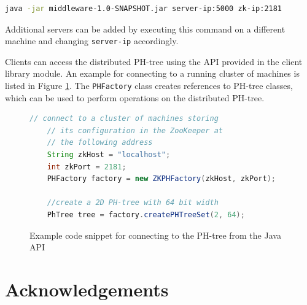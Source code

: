 \documentclass[11pt,a4paper]{globis-book}
\begin{document}
\begin{lstlisting}[language=BASH]
    java -jar middleware-1.0-SNAPSHOT.jar server-ip:5000 zk-ip:2181
\end{lstlisting}

Additional servers can be added by executing this command on a different machine and changing \texttt{server-ip} accordingly. 

Clients can access the distributed PH-tree using the API provided in the client library module. An example for connecting to a running cluster of machines is listed in Figure \ref{fig:java-code}. The \texttt{PHFactory} class creates references to PH-tree classes, which can be used to perform operations on the distributed PH-tree.

\begin{figure}
\begin{lstlisting}[language=Java]       
    // connect to a cluster of machines storing 
    // its configuration in the ZooKeeper at 
    // the following address 
    String zkHost = "localhost";
    int zkPort = 2181;
    PHFactory factory = new ZKPHFactory(zkHost, zkPort);

    //create a 2D PH-tree with 64 bit width
    PhTree tree = factory.createPHTreeSet(2, 64);    
\end{lstlisting}
\caption{Example code snippet for connecting to the PH-tree from the Java API}
\label{fig:java-code}
\end{figure}
\listoffigures

\chapter*{Acknowledgements}

\newpage
\thispagestyle{empty}





\end{document}
